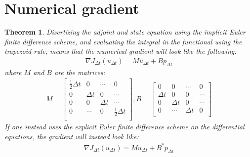 \documentclass[11pt,a4paper]{article}
\newtheorem{theorem}{Theorem}
\begin{document}
\section{Numerical gradient}
\begin{theorem}
Discrtizing the adjoint and state equation using the implicit Euler finite difference scheme, and evaluating the integral in the functional using the trapezoid rule, means that the numerical gradient will look like the following:
\begin{align}
\nabla J_{\Delta t}(u_{\Delta t}) = Mu_{\Delta t} + Bp_{\Delta t} \label{num_grad}
\end{align}
where $M$ and $B$ are the matrices:
\begin{align*}
M=\left[ \begin{array}{cccc}
   \frac{1}{2}\Delta t & 0 & \cdots & 0 \\  
   0& \Delta t & 0 & \cdots \\ 
   0 &0 & \Delta t  & \cdots \\
   0 &\cdots &0 & \frac{1}{2}\Delta t   \\
   \end{array}  \right] 
,B = \left[ \begin{array}{cccc}
   0& 0 & \cdots & 0 \\  
   \Delta t& 0 & 0 & \cdots \\ 
   0 & \Delta t& 0  & \cdots \\
   0 &\cdots & \Delta t& 0   \\
   \end{array}  \right] 
\end{align*}
If one instead uses the explicit Euler finite difference scheme on the differential equations, the gradient will instead look like:
\begin{align*}
\nabla J_{\Delta t}(u_{\Delta t}) = Mu_{\Delta t} + B^*p_{\Delta t}
\end{align*}
\end{theorem}
\end{document}

